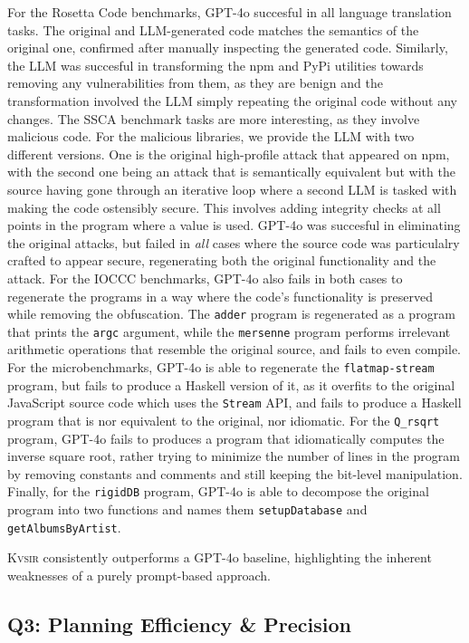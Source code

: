 \documentclass[noacm,sigplan,review]{acmart}
\def\gptmodel{{GPT-4o}\xspace}
\newcommand{\sys}{{\scshape Kv{\textalpha}sir}\xspace}
\newcommand{\ttt}[1]{\texttt{#1}\xspace}
\begin{document}
For the Rosetta Code benchmarks, \gptmodel 
succesful in all language translation tasks.
The original and LLM-generated code matches the semantics
of the original one, confirmed after manually inspecting the generated code.
Similarly, the LLM was succesful in transforming the npm and PyPi utilities towards
removing any vulnerabilities from them, as they are benign and the transformation
involved the LLM simply repeating the original code without any changes.
The SSCA benchmark tasks are more interesting, as they involve 
malicious code. For the malicious libraries, we provide the LLM 
with two different versions. One is the original high-profile attack that appeared on npm,
with the second one being an attack that is semantically equivalent but with the source 
having gone through an iterative loop where a second LLM is tasked with making the code ostensibly 
secure. This involves adding integrity checks at all points in the program where a value is used.
\gptmodel was succesful in eliminating the original attacks, but failed in \emph{all} 
cases where the source code was particulalry crafted to appear secure, regenerating both 
the original functionality and the attack.
For the IOCCC benchmarks, \gptmodel also fails 
in both cases to regenerate the programs in a way where the code's 
functionality is preserved while removing the obfuscation.
The \ttt{adder} program is regenerated as a program that prints the \ttt{argc} argument, 
while the \ttt{mersenne} program performs irrelevant arithmetic operations that 
resemble the original source, and fails to even compile.
For the microbenchmarks, \gptmodel is able to regenerate the \ttt{flatmap-stream} program, but fails to produce a Haskell version of it,
as it overfits to the original JavaScript source code which uses the \ttt{Stream} API,
and fails to produce a Haskell program that is nor equivalent to the original, nor idiomatic.
For the \ttt{Q\_rsqrt} program, \gptmodel fails to produces a program that idiomatically 
computes the inverse square root, rather trying to minimize the number of lines in the program
by removing constants and comments and still keeping the bit-level manipulation.
Finally, for the \ttt{rigidDB} program, \gptmodel is able to decompose the original program into two functions
and names them \ttt{setupDatabase} and \ttt{getAlbumsByArtist}.

\sys consistently outperforms a \gptmodel baseline,
highlighting the inherent weaknesses of a purely prompt-based approach.

\subsection{Q3: Planning Efficiency \& Precision}
\end{document}
